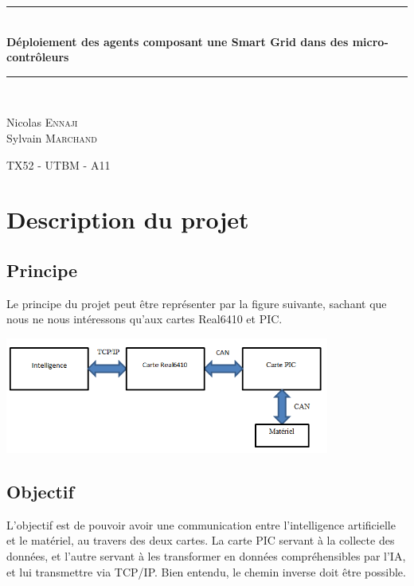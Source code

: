 \documentclass[a4,french,12pt]{article}
\newcommand{\HRule}{\rule{\linewidth}{0.5mm}}
\begin{document}
\begin{titlepage}
\begin{center}

\HRule \\[0.4cm]
{ \huge \bfseries Déploiement des agents composant une Smart Grid dans des micro-contrôleurs}\\[0.4cm]
 
\HRule \\[1.5cm]
\begin{minipage}{0.4\textwidth}
\begin{flushleft} \large

Nicolas \textsc{Ennaji} \\
Sylvain \textsc{Marchand} 

\end{flushleft}
\end{minipage}

\vfill 
{\large TX52 - UTBM - A11}

\end{center}
\end{titlepage}

\tableofcontents

\newpage

\section{Description du projet}
  \subsection{Principe}
Le principe du projet peut être représenter par la figure suivante, sachant que nous ne nous intéressons qu'aux cartes Real6410 et PIC.

\includegraphics[width=0.8\textwidth]{images/Recap.png}

  \subsection{Objectif}
L'objectif est de pouvoir avoir une communication entre l'intelligence artificielle et le matériel, au travers des deux cartes. La carte PIC servant à la collecte des données, et l'autre servant à les transformer en données compréhensibles par l'IA, et lui transmettre via TCP/IP. Bien entendu, le chemin inverse doit être possible.
\end{document}
